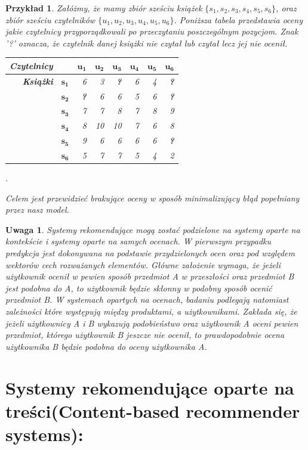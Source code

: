 \documentclass[12pt,a4paper]{report}
\newtheorem{przyklad}{Przykład}[chapter]
\newtheorem{uwaga}[df]{Uwaga}
\begin{document}
\begin{przyklad}
Załóżmy, że mamy zbiór sześciu książek $\{s_1, s_2, s_3, s_4, s_5, s_6\}$, oraz zbiór sześciu czytelników $\{u_1, u_2, u_3, u_4, u_5, u_6\}$.
Poniższa tabela przedstawia oceny jakie czytelnicy przyporządkowali po przeczytaniu poszczególnym pozycjom. Znak '?' oznacza, że czytelnik danej książki nie czytał lub czytał lecz jej nie ocenił.
\begin{center}
\begin{tabular}{|r|r|r|r|r|r|r|r|} \hline
\textbf{Czytelnicy} & & $\mathbf{u_1}$ & $\mathbf{u_2}$ & $\mathbf{u_3}$ & $\mathbf{u_4}$ & $\mathbf{u_5}$ & $\mathbf{u_6}$ \\
\hline
\hline
\textbf{Książki} &$\mathbf{s_1}$ & 6 & 3 & \textbf{?} & 6 & 4 & \textbf{?} \\
\hline
&$\mathbf{s_2}$ & \textbf{?} & 6 & 6 & 5 & 6 & \textbf{?} \\
\hline
&$\mathbf{s_3}$ & 7 & 7 & 8 & 7 & 8 & 9  \\
\hline
&$\mathbf{s_4}$ & 8 & 10 & 10 & 7 & 6 & 8 \\
\hline
&$\mathbf{s_5}$ & 9 & 6 & 6 & 6 & 6 & \textbf{?} \\
\hline
&$\mathbf{s_6}$ & 5 & 7 & 7 & 5 & 4 & 2 \\
\hline
\end{tabular}.
\end{center}

Celem jest przewidzieć brakujące oceny w sposób minimalizujący błąd popełniany przez nasz model.
\end{przyklad}
\begin{uwaga}
Systemy rekomendujące mogą zostać podzielone na systemy oparte na kontekście i systemy oparte na samych ocenach. W pierwszym przypadku predykcja jest dokonywana na podstawie przydzielonych ocen oraz pod względem wektorów cech rozważanych elementów. Główne założenie wymaga, że jeżeli użytkownik ocenił w pewien sposób przedmiot A w przeszłości oraz przedmiot B jest podobna do A, to użytkownik będzie skłonny w podobny sposób ocenić przedmiot B. W systemach opartych na ocenach, badaniu podlegają natomiast zależności które występują między produktami, a użytkownikami. Zakłada się, że jeżeli użytkownicy A i B wykazują podobieństwo oraz użytkownik A oceni pewien przedmiot, którego użytkownik B jeszcze nie ocenił, to prawdopodobnie ocena użytkownika B będzie podobna do oceny użytkownika A.
\end{uwaga}
\section{Systemy rekomendujące oparte na treści(Content-based recommender systems):}
\end{document}
